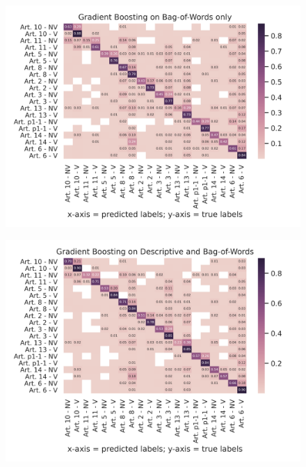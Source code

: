 \documentclass{article}
\begin{document}
\begin{figure}[!htb]
    \centering
    \includegraphics[scale=0.7]{data/analysis/cm/multiclass_cm_test_gradient_boosting_bag-of-words_only.png}  
\end{figure}
\begin{figure}[!htb]
    \centering
    \includegraphics[scale=0.7]{data/analysis/cm/multiclass_cm_test_gradient_boosting_descriptive_and_bag-of-words.png}  
\end{figure}
\end{document}
